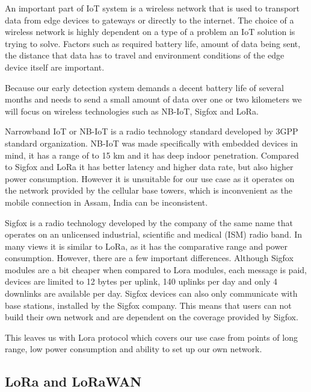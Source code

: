 An important part of IoT system is a wireless network that is used to transport data from edge devices to gateways or directly to the internet.
The choice of a wireless network is highly dependent on a type of a problem an IoT solution is trying to solve.
Factors such as required battery life, amount of data being sent, the distance that data has to travel and environment conditions of the edge device itself are important.

Because our early detection system demands a decent battery life of several months and needs to send a small amount of data over one or two kilometers we will focus on wireless technologies such as NB-IoT, Sigfox and LoRa.

Narrowband IoT or NB-IoT is a radio technology standard developed by 3GPP standard organization\cite{lora_nbiot}.
NB-IoT was made specifically with embedded devices in mind, it has a range of to 15 \si{\kilo\meter} and it has deep indoor penetration\cite{lora_nbiot}.
Compared to Sigfox and LoRa it has better latency and higher data rate, but also higher power consumption\cite{lora_nbiot_sigfox}.
However it is unsuitable for our use case as it operates on the network provided by the cellular base towers, which is inconvenient as the mobile connection in Assam, India can be inconsistent\cite{wildlabs-elephants}.

Sigfox is a radio technology developed by the company of the same name that operates on an unlicensed industrial, scientific and medical (ISM) radio band.
In many views it is similar to LoRa, as it has the comparative range and power consumption\cite{lora_nbiot_sigfox}.
However, there are a few important differences.
Although Sigfox modules are a bit cheaper when compared to Lora modules, each message is paid, devices are limited to 12 bytes per uplink, 140 uplinks per day and only 4 downlinks are available per day.
Sigfox devices can also only communicate with base stations, installed by the Sigfox company\cite{lora_nbiot_sigfox}.
This means that users can not build their own network and are dependent on the coverage provided by Sigfox.

This leaves us with Lora protocol which covers our use case from points of long range, low power consumption and ability to set up our own network. 


\subsection{ LoRa and LoRaWAN}

